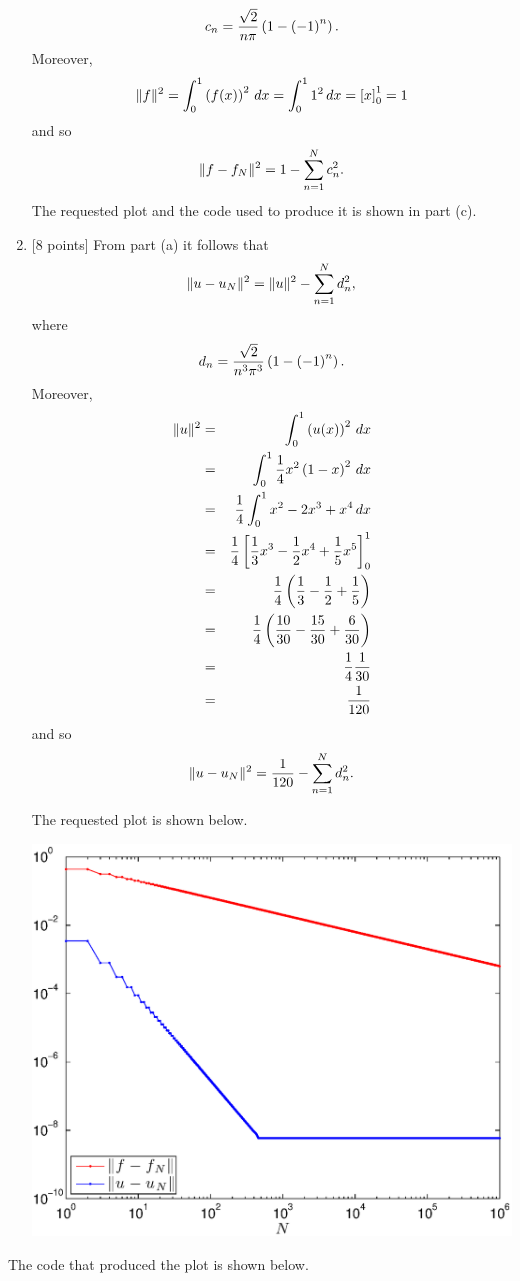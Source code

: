 \begin{solution}
\begin{enumerate}
\[c_n={\sqrt{2} \over n\pi}\left(1-\left(-1\right)^n\right).
\]
Moreover,
\[
\|f\|^2=\int_0^1\left(f(x)\right)^2\,dx=\int_0^11^2\,dx=\left[x\right]_0^1=1
\]
and so
\[
\|f-f_N\|^2 = 1 - \sum_{n=1}^N c_n^2.
\]
The requested plot and the code used to produce it is shown in part (c).
\\
\item {[8 points]} From part (a) it follows that
\[
\|u-u_N\|^2 = \|u\|^2 - \sum_{n=1}^N d_n^2,
\]
where
\[
d_n={\sqrt{2} \over n^3\pi^3}\left(1-\left(-1\right)^n\right).
\]
Moreover,
\begin{eqnarray*}
\|u\|^2&=&\int_0^1\left(u(x)\right)^2\,dx
\\
&=&\int_0^1{1\over 4}x^2\left(1-x\right)^2\,dx
\\
&=&{1\over 4}\int_0^1x^2-2x^3+x^4\,dx
\\
&=&{1\over 4}\left[{1\over 3}x^3-{1\over 2}x^4+{1\over 5}x^5\right]_0^1
\\
&=&{1\over 4}\left({1\over 3}-{1\over 2}+{1\over 5}\right)
\\
&=&{1\over 4}\left({10\over 30}-{15\over 30}+{6\over 30}\right)
\\
&=&{1\over 4}{1\over 30}
\\
&=&{1\over 120}
\end{eqnarray*}
and so
\[
\|u-u_N\|^2 = {1\over 120} - \sum_{n=1}^N d_n^2.
\]

The requested plot is shown below. 

\begin{center}\includegraphics[scale=0.7]{fourerr}\end{center}
\end{enumerate}

The code that produced the plot is shown below.



\end{solution}
